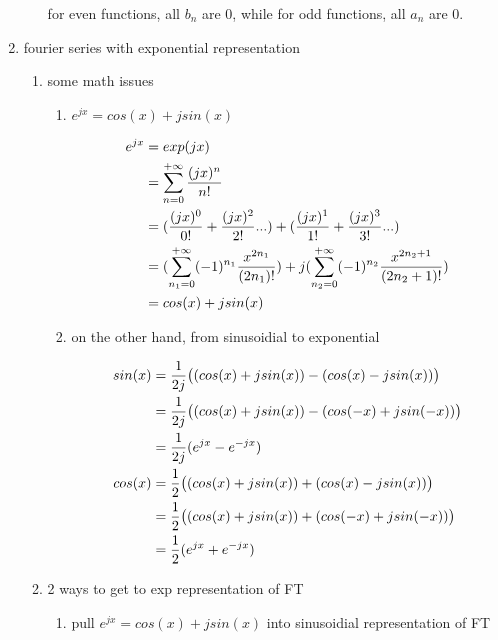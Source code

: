 \documentclass[11pt]{article}
\begin{document}
\begin{enumerate}
\begin{enumerate}
for even functions, all \(b_n\) are 0, while for odd functions, all \(a_n\) are 0.
\end{enumerate}
\item fourier series with exponential representation
\label{sec:org3bcf859}
\begin{enumerate}
\item some math issues
\label{sec:orgef8fdd7}
\begin{enumerate}
\item \(e^{jx} = cos(x) + j sin(x)\)
\label{sec:org0687b66}

\begin{align}
  e^{j x} & = exp(j x) \notag \\
          & = \sum_{n = 0}^{+\infty} \frac{(j x)^n}{n!} \notag \\
          & = (\frac{(j x)^0}{0!} + \frac{(j x)^2}{2!} ...) + (\frac{(j x)^1}{1!} + \frac{(j x)^3}{3!} ...) \notag \\
          & =
            (\sum_{n_1 = 0}^{+\infty} (-1)^{n_1}\frac{x^{2 n_1}}{(2 n_1)!})
            +
            j(\sum_{n_2 = 0}^{+\infty} (-1)^{n_2}\frac{x^{2 n_2 + 1}}{(2n_2 + 1)!}) \notag \\
          & = cos(x) + j sin(x)
\end{align}
\item on the other hand, from sinusoidial to exponential
\label{sec:orga21c89a}

\begin{align}
  sin(x) & = \frac{1}{2 j} \bigl( (cos(x) + j sin(x)) - (cos(x) - j sin(x)) \bigr) \notag \\
         & = \frac{1}{2 j} \bigl( (cos(x) + j sin(x)) - (cos(-x) + j sin(-x)) \bigr) \notag \\
         & = \frac{1}{2 j} (e^{j x} - e^{-j x}) \\
  cos(x) & = \frac{1}{2} \bigl( (cos(x) + j sin(x)) + (cos(x) - j sin(x)) \bigr) \notag \\
         & = \frac{1}{2} \bigl( (cos(x) + j sin(x)) + (cos(-x) + j sin(-x)) \bigr) \notag \\
         & = \frac{1}{2} (e^{j x} + e^{-j x})
\end{align}
\end{enumerate}
\item 2 ways to get to exp representation of FT
\label{sec:org49b2407}
\begin{enumerate}
\item pull \(e^{jx} = cos(x) + j sin(x)\) into sinusoidial representation of FT
\label{sec:org0dbb219}


\end{enumerate}
\end{enumerate}
\end{enumerate}
\end{document}
